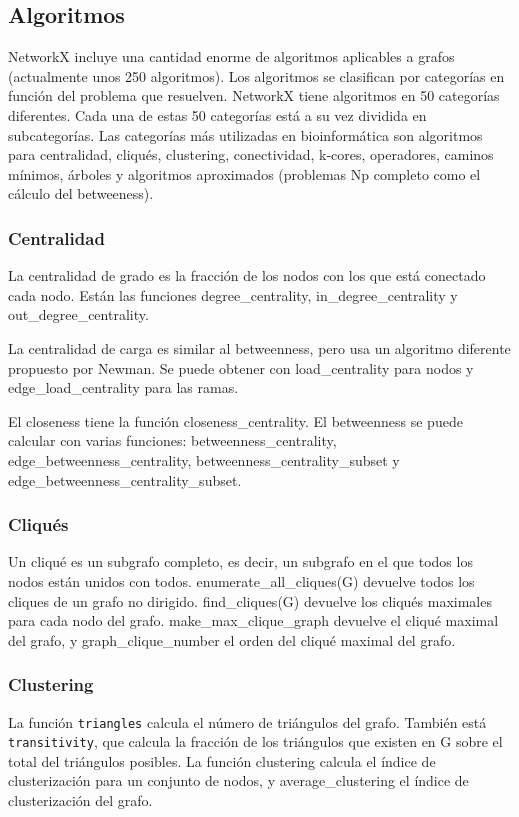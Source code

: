 \subsection{Algoritmos}
NetworkX incluye una cantidad enorme de algoritmos aplicables a grafos (actualmente
unos 250 algoritmos). Los algoritmos se clasifican por categorías en función del problema que resuelven. NetworkX tiene algoritmos en 50 categorías diferentes. Cada una de estas 50 categorías está a su vez dividida en subcategorías. Las categorías más utilizadas en bioinformática son algoritmos para centralidad, cliqués, clustering, conectividad, k-cores, operadores, caminos mínimos, árboles y algoritmos aproximados (problemas Np completo como el cálculo del betweeness).

\subsubsection{Centralidad}
La centralidad de grado es la fracción de los nodos con los que está conectado cada nodo. Están las funciones degree\_centrality, in\_degree\_centrality y out\_degree\_centrality. 

La centralidad de carga es similar al betweenness, pero usa un algoritmo diferente propuesto por Newman. Se puede obtener con load\_centrality para nodos y edge\_load\_centrality para las ramas.

El closeness tiene la función closeness\_centrality. El betweenness se puede calcular con varias funciones: betweenness\_centrality, edge\_betweenness\_centrality, betweenness\_centrality\_subset y edge\_betweenness\_centrality\_subset.

\subsubsection{Cliqués}
Un cliqué es un subgrafo completo, es decir, un subgrafo en el que todos los nodos están unidos con todos. enumerate\_all\_cliques(G) devuelve todos los cliques de un grafo no dirigido. find\_cliques(G) devuelve los cliqués maximales para cada nodo del grafo. make\_max\_clique\_graph devuelve el cliqué maximal del grafo, y graph\_clique\_number el orden del cliqué maximal del grafo.

\subsubsection{Clustering}
La función \texttt{triangles} calcula el número de triángulos del grafo. También está \texttt{transitivity}, que calcula la fracción de los triángulos que existen en G sobre el total del triángulos posibles. La función clustering calcula el índice de clusterización para un conjunto de nodos, y average\_clustering el índice de clusterización del grafo. 

